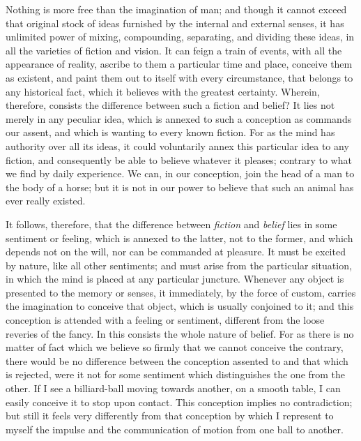 \documentclass[]{article}
\begin{document}
\begin{sectionbody}

\humeparagraph  Nothing is more free than the imagination of man; and though it cannot exceed that original stock of ideas furnished by the internal and external senses, it has unlimited power of mixing, compounding, separating, and dividing these ideas, in all the varieties of fiction and vision. It can feign a train of events, with all the appearance of reality, ascribe to them a particular time and place, conceive them as existent, and paint them out to itself with every circumstance, that belongs to any historical fact, which it believes with the greatest certainty. Wherein, therefore, consists the difference between such a fiction and belief? It lies not merely in any peculiar idea, which is annexed to such a conception as commands our assent, and which is wanting to every known fiction. For as the mind has authority over all its ideas, it could voluntarily annex this particular idea to any fiction, and consequently be able to believe whatever it pleases; contrary to what we find by daily experience. We can, in our conception, join the head of a man to the body of a horse; but it is not in our power to believe that such an animal has ever really existed.

\humeparagraph  It follows, therefore, that the difference between \emph{fiction} and \emph{belief} lies in some sentiment or feeling, which is annexed to the latter, not to the former, and which depends not on the will, nor can be commanded at pleasure. It must be excited by nature, like all other sentiments; and must arise from the particular situation, in which the mind is placed at any particular juncture. Whenever any object is presented to the memory or senses, it immediately, by the force of custom, carries the imagination to conceive that object, which is usually conjoined to it; and this conception is attended with a feeling or sentiment, different from the loose reveries of the fancy. In this consists the whole nature of belief. For as there is no matter of fact which we believe so firmly that we cannot conceive the contrary, there would be no difference between the conception assented to and that which is rejected, were it not for some sentiment which distinguishes the one from the other. If I see a billiard-ball moving towards another, on a smooth table, I can easily conceive it to stop upon contact. This conception implies no contradiction; but still it feels very differently from that conception by which I represent to myself the impulse and the communication of motion from one ball to another.


\end{sectionbody}
\end{document}
